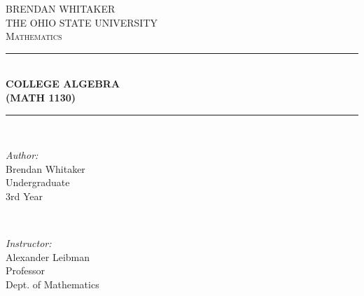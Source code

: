 \documentclass[12pt]{amsbook}
\theoremstyle{plain}
\numberwithin{section}{chapter}
\numberwithin{equation}{chapter}
\theoremstyle{definition}
\theoremstyle{remark}
\theoremstyle{plain}
\begin{document}
\begin{titlepage}

\newcommand{\HRule}{\rule{\linewidth}{0.5mm}} %

\center %
 

\textsc{\LARGE BRENDAN WHITAKER }\\[0.3cm] %
\textsc{\LARGE THE OHIO STATE UNIVERSITY  }\\[0.3cm]
\textsc{\Large Mathematics}\\[0.5cm] %


\HRule \\[0.4cm]
{ \Huge \bfseries COLLEGE ALGEBRA\\
\vspace{1mm}  (MATH 1130)}\\[0.03cm] %
\HRule \\[1.5cm]

 

\begin{minipage}{0.4\textwidth}
\begin{flushleft} \large
\emph{Author:}\\
Brendan Whitaker \\Undergraduate\\3rd Year %
\end{flushleft}
\end{minipage}
~
\begin{minipage}{0.4\textwidth}
\begin{flushright} \large
\emph{Instructor:} \\
Alexander Leibman\\Professor\\Dept. of Mathematics %
\end{flushright}
\end{minipage}\\[1cm]


\end{titlepage}
\end{document}
